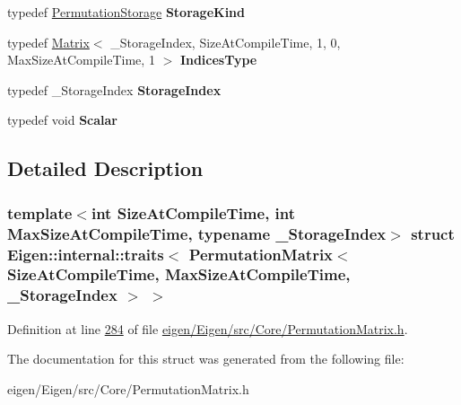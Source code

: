 \begin{DoxyCompactItemize}
typedef \hyperlink{struct_eigen_1_1_permutation_storage}{Permutation\+Storage} {\bfseries Storage\+Kind}
\item 
\mbox{\label{struct_eigen_1_1internal_1_1traits_3_01_permutation_matrix_3_01_size_at_compile_time_00_01_max_sd0808d93099012556270f7c7cd36fcc5_ae1a4a00b2b672bb90f5fa2865a685089}} 
typedef \hyperlink{group___core___module_class_eigen_1_1_matrix}{Matrix}$<$ \+\_\+\+Storage\+Index, Size\+At\+Compile\+Time, 1, 0, Max\+Size\+At\+Compile\+Time, 1 $>$ {\bfseries Indices\+Type}
\item 
\mbox{\label{struct_eigen_1_1internal_1_1traits_3_01_permutation_matrix_3_01_size_at_compile_time_00_01_max_sd0808d93099012556270f7c7cd36fcc5_a3b0de4f65dbfa61abb07e006b2961804}} 
typedef \+\_\+\+Storage\+Index {\bfseries Storage\+Index}
\item 
\mbox{\label{struct_eigen_1_1internal_1_1traits_3_01_permutation_matrix_3_01_size_at_compile_time_00_01_max_sd0808d93099012556270f7c7cd36fcc5_aed1bb3143b5cb628201bd7dab896a797}} 
typedef void {\bfseries Scalar}
\end{DoxyCompactItemize}


\subsection{Detailed Description}
\subsubsection*{template$<$int Size\+At\+Compile\+Time, int Max\+Size\+At\+Compile\+Time, typename \+\_\+\+Storage\+Index$>$\newline
struct Eigen\+::internal\+::traits$<$ Permutation\+Matrix$<$ Size\+At\+Compile\+Time, Max\+Size\+At\+Compile\+Time, \+\_\+\+Storage\+Index $>$ $>$}



Definition at line \hyperlink{eigen_2_eigen_2src_2_core_2_permutation_matrix_8h_source_l00284}{284} of file \hyperlink{eigen_2_eigen_2src_2_core_2_permutation_matrix_8h_source}{eigen/\+Eigen/src/\+Core/\+Permutation\+Matrix.\+h}.



The documentation for this struct was generated from the following file\+:\begin{DoxyCompactItemize}
\item 
eigen/\+Eigen/src/\+Core/\+Permutation\+Matrix.\+h\end{DoxyCompactItemize}
